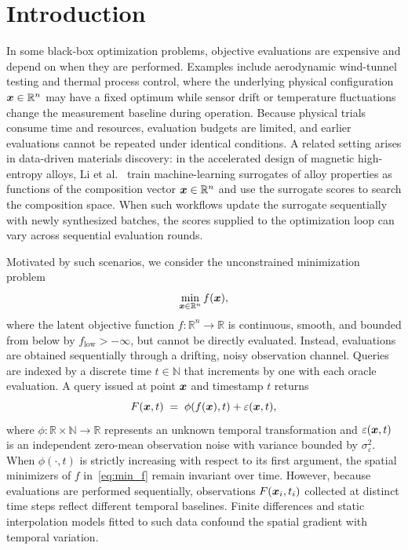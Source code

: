 
\section{Introduction}
\label{sec:intro}

In some black-box optimization problems, objective evaluations are expensive and depend on when they are performed. Examples include aerodynamic wind-tunnel testing and thermal process control, where the underlying physical configuration $\boldsymbol{x} \in \mathbb{R}^n$ may have a fixed optimum while sensor drift or temperature fluctuations change the measurement baseline during operation. Because physical trials consume time and resources, evaluation budgets are limited, and earlier evaluations cannot be repeated under identical conditions. A related setting arises in data-driven materials discovery: in the accelerated design of magnetic high-entropy alloys, Li et al.~\cite{Li2022HEA} train machine-learning surrogates of alloy properties as functions of the composition vector $\boldsymbol{x} \in \mathbb{R}^n$ and use the surrogate scores to search the composition space. When such workflows update the surrogate sequentially with newly synthesized batches, the scores supplied to the optimization loop can vary across sequential evaluation rounds.

Motivated by such scenarios, we consider the unconstrained minimization problem
\begin{equation}
  \label{eq:min_f}
  \min_{\boldsymbol{x} \in \mathbb{R}^n} f(\boldsymbol{x}),
\end{equation}
where the latent objective function $f:\mathbb{R}^n\to\mathbb{R}$ is continuous, smooth, and bounded from below by $f_{\mathrm{low}}>-\infty$, but cannot be directly evaluated. Instead, evaluations are obtained sequentially through a drifting, noisy observation channel. Queries are indexed by a discrete time $t \in \mathbb{N}$ that increments by one with each oracle evaluation. A query issued at point $\boldsymbol{x}$ and timestamp $t$ returns
\begin{equation}
  \label{eq:oracle_intro}
    F(\boldsymbol{x},t) \;=\; \phi(f(\boldsymbol{x}),t) + \varepsilon(\boldsymbol{x},t),
\end{equation}
where $\phi:\mathbb{R}\times\mathbb{N}\to\mathbb{R}$ represents an unknown temporal transformation and $\varepsilon(\boldsymbol{x},t)$ is an independent zero-mean observation noise with variance bounded by $\sigma_\varepsilon^2$. When $\phi(\cdot, t)$ is strictly increasing with respect to its first argument, the spatial minimizers of $f$ in~\eqref{eq:min_f} remain invariant over time. However, because evaluations are performed sequentially, observations $F(\boldsymbol{x}_i, t_i)$ collected at distinct time steps reflect different temporal baselines. Finite differences and static interpolation models fitted to such data confound the spatial gradient with temporal variation.

